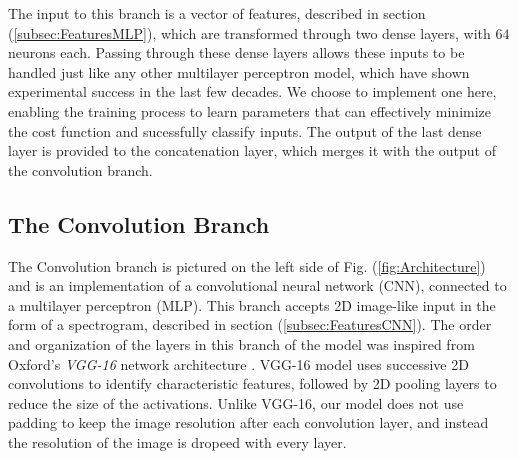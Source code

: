 \documentclass[conference,onecolumn,letterpaper]{IEEEtran}
\begin{document}
The input to this branch is a vector of features, described in section (\ref{subsec:FeaturesMLP}), which are transformed through two dense layers, with $64$ neurons each. Passing through these dense layers allows these inputs to be handled just like any other multilayer perceptron model, which have shown experimental success in the last few decades. We choose to implement one here, enabling the training process to learn parameters that can effectively minimize the cost function and sucessfully classify inputs. The output of the last dense layer is provided to the concatenation layer, which merges it with the output of the convolution branch. 




\subsection{The Convolution Branch}
\label{subsec:CNN}

The Convolution branch is pictured on the left side of Fig. (\ref{fig:Architecture}) and is an implementation of a convolutional neural network (CNN), connected to a multilayer perceptron (MLP). This branch accepts 2D image-like input in the form of a spectrogram, described in section (\ref{subsec:FeaturesCNN}). The order and organization of the layers in this branch of the model was inspired from Oxford's \textit{VGG-16} network architecture \cite{Geron}. VGG-16 model uses successive 2D convolutions to identify characteristic features, followed by 2D pooling layers to reduce the size of the activations. Unlike VGG-16, our model does not use padding to keep the image resolution after each convolution layer, and instead the resolution of the image is dropeed with every layer.
\end{document}
